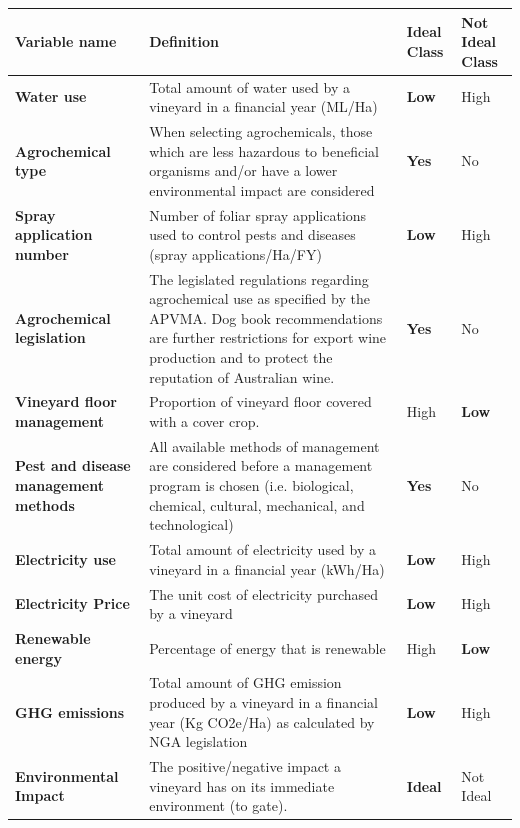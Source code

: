 \begin{table}[h]\label{tab:definitions} 
    \begin{tabular}{@{}llll@{}}
    \toprule
    \textbf{Variable name} & Definition & \textbf{Ideal Class} & Not Ideal Class \\ \midrule
    \textbf{Water use} & Total amount of water used by a vineyard in a financial year (ML/Ha) & \textbf{Low} & High \\
    \textbf{Agrochemical type} & When selecting agrochemicals, those which are less hazardous to beneficial organisms and/or have a lower environmental impact are considered & \textbf{Yes} & No \\
    \textbf{Spray application number} & Number of foliar spray applications used to control pests and diseases (spray applications/Ha/FY) & \textbf{Low} & High \\
    \textbf{Agrochemical legislation} & The legislated regulations regarding agrochemical use as specified by the APVMA. Dog book recommendations are further restrictions for export wine production and to protect the reputation of Australian wine. & \textbf{Yes} & No \\
    \textbf{Vineyard floor management} & Proportion of vineyard floor covered with a cover crop. & High & \textbf{Low} \\
    \textbf{Pest and disease management methods} & All available methods of management are considered before a management program is chosen (i.e. biological, chemical, cultural, mechanical, and technological) & \textbf{Yes} & No \\
    \textbf{Electricity use} & Total amount of electricity used by a vineyard in a financial year (kWh/Ha) & \textbf{Low} & High \\
    \textbf{Electricity Price} & The unit cost of electricity purchased by a vineyard & \textbf{Low} & High \\
    \textbf{Renewable energy} & Percentage of energy that is renewable & High & \textbf{Low} \\
    \textbf{GHG emissions} & Total amount of GHG emission produced by a vineyard in a financial year (Kg CO2e/Ha) as calculated  by NGA legislation & \textbf{Low} & High \\
    \textbf{Environmental Impact} & The positive/negative impact a vineyard has on its immediate environment (to gate). & \textbf{Ideal} & Not Ideal \\

\end{tabular}
\end{table}
